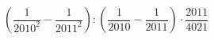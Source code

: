 \begin{ex}[type=calculate]
	\begin{condition}
		\( \left( \dfrac{1}{2010^2}-\dfrac{1}{2011^2} \right):\left( \dfrac{1}{2010}-\dfrac{1}{2011} \right)\cdot\dfrac{2011}{4021} \)
	\end{condition}
\end{ex}